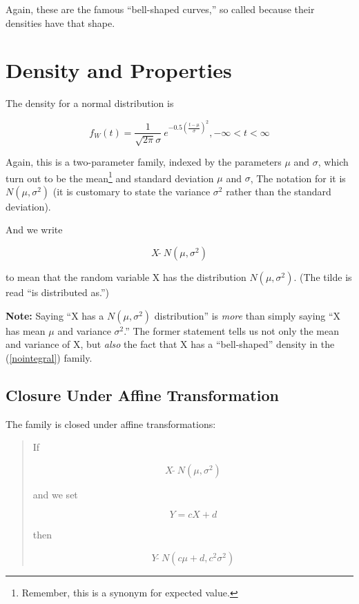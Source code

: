 
\label{chap:normal}

Again, these are the famous ``bell-shaped curves,'' so called because
their densities have that shape.

\section{Density and Properties}

The density for a normal distribution is

\begin{equation}
\label{nointegral}
f_W(t) = \frac{1}{\sqrt{2\pi} \sigma} ~ e^{- 0.5 \left (\frac{t-\mu}{\sigma}
\right )^2}, -\infty < t < \infty
\end{equation}

Again, this is a two-parameter family, indexed by the parameters $\mu$
and $\sigma$, which turn out to be the mean\footnote{Remember, this is a
synonym for expected value.} and standard deviation  $\mu$ and $\sigma$,
The notation for it is $N(\mu,\sigma^2)$ (it is customary to state
the variance $\sigma^2$ rather than the standard deviation).

And we write 

\begin{equation}
X ~ \widetilde{ } ~ N(\mu,\sigma^2)
\end{equation}

to mean that the random variable X has the distribution $N(\mu,\sigma^2)$.
(The tilde is read ``is distributed as.'')


{\bf Note:} Saying ``X has a $N(\mu,\sigma^2)$ distribution'' is {\it
more} than simply saying ``X has mean $\mu$ and variance $\sigma^2$.''
The former statement tells us not only the mean and variance of X, but
{\it also} the fact that X has a ``bell-shaped'' density in the
(\ref{nointegral}) family.

\subsection{Closure Under Affine Transformation}
\label{affine}

The family is closed under affine transformations:

\begin{quote}

If 

\begin{equation}
X ~ \widetilde{} ~ N(\mu,\sigma^2)
\end{equation}

and we set 

\begin{equation}
Y = cX + d 
\end{equation}

then

\begin{equation}
Y ~ \widetilde{} ~ N(c\mu+d,c^2\sigma^2)
\end{equation}

\end{quote}

